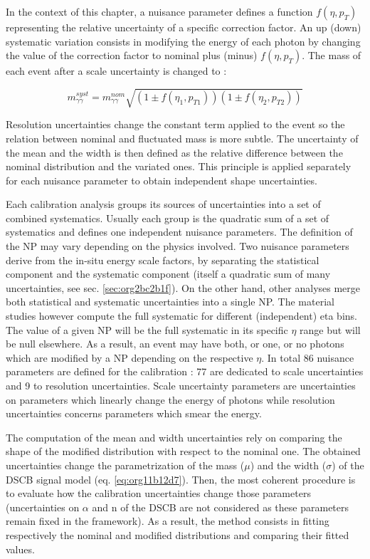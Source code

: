 In the context of this chapter, a nuisance parameter defines a function $f(\eta,p_T)$ representing the relative uncertainty of a specific correction factor.
An up (down) systematic variation consists in modifying the energy of each photon by changing the value of the correction factor to nominal plus (minus) $f(\eta, p_T)$.
The mass of each event after a scale uncertainty is changed to :

\begin{equation}
m_{\gamma\gamma}^{syst} = m_{\gamma\gamma}^{nom} \sqrt{ (1\pm f(\eta_1,p_{T1}))(1\pm f(\eta_2, p_{T2}))}
\end{equation}

Resolution uncertainties change the constant term applied to the event so the relation between nominal and fluctuated mass is more subtle.
The uncertainty of the mean and the width is then defined as the relative difference between the nominal distribution and the variated ones.
This principle is applied separately for each nuisance parameter to obtain independent shape uncertainties.

Each calibration analysis groups its sources of uncertainties into a set of combined systematics.
Usually each group is the quadratic sum of a set of systematics and defines one independent nuisance parameters.
The definition of the NP may vary depending on the physics involved.
Two nuisance parameters derive from the in-situ energy scale factors, by separating the statistical component and the systematic component (itself a quadratic sum of many uncertainties, see sec. \ref{sec:org2bc2b1f}).
On the other hand, other analyses merge both statistical and systematic uncertainties into a single NP.
The material studies however compute the full systematic for different (independent) eta bins.
The value of a given NP will be the full systematic in its specific $\eta$ range but will be null elsewhere.
As a result, an event may have both, or one, or no photons which are modified by a NP depending on the respective $\eta$.
In total 86 nuisance parameters are defined for the calibration : 77 are dedicated to scale uncertainties and 9 to resolution uncertainties.
Scale uncertainty parameters are uncertainties on parameters which linearly change the energy of photons while resolution uncertainties concerns parameters which smear the energy.

The computation of the mean and width uncertainties rely on comparing the shape of the modified distribution with respect to the nominal one.
The obtained uncertainties change the parametrization of the mass ($\mu$) and the width ($\sigma$) of the DSCB signal model (eq. \ref{eq:org11b12d7}).
Then, the most coherent procedure is to evaluate how the calibration uncertainties change those parameters (uncertainties on $\alpha$ and n of the DSCB are not considered as these parameters remain fixed in the framework).
As a result, the method consists in fitting respectively the nominal and modified distributions and comparing their fitted values.

